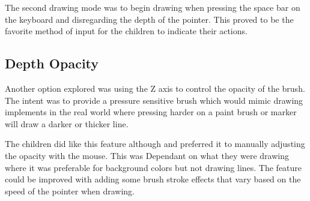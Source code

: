 The second drawing mode was to begin drawing when pressing the space bar on the keyboard and disregarding the depth of the pointer. This proved to be the favorite method of input for the children to indicate their actions. 

\subsection{Depth Opacity}

Another option explored was using the Z axis to control the opacity of the brush. The intent was to provide a pressure sensitive brush which would mimic drawing implements in the real world where pressing harder on a paint brush or marker will draw a darker or thicker line. 

The children did like this feature although and preferred it to manually adjusting the opacity with the mouse. This was Dependant on what they were drawing where it was preferable for background colors but not drawing lines. The feature could be improved with adding some brush stroke effects that vary based on the speed of the pointer when drawing. 

